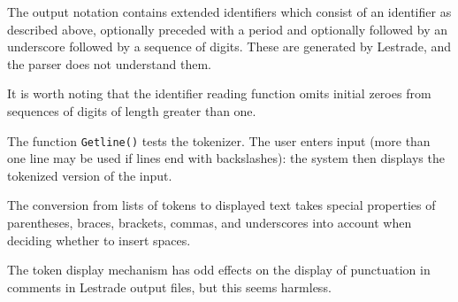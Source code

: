 \documentclass[12pt]{article}
\begin{document}
The output notation contains extended identifiers which consist of an identifier as described above, optionally preceded with a period and optionally followed by an underscore followed by a sequence of digits.  These are generated by Lestrade, and the parser does not understand them.

It is worth noting that the identifier reading function omits initial zeroes from sequences of digits of length greater than one.

The function {\tt Getline()} tests the tokenizer.  The user enters input (more than one line may be used if lines end with backslashes):  the system then displays the tokenized version
of the input.

The conversion from lists of tokens to displayed text takes special properties of parentheses, braces, brackets, commas, and underscores into account when deciding whether to insert spaces.

The token display mechanism has odd effects on the display of punctuation in comments in Lestrade output files, but this seems harmless.

\newpage
\end{document}
